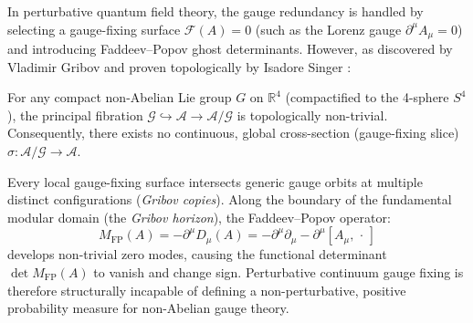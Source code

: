 In perturbative quantum field theory, the gauge redundancy is handled by selecting a gauge-fixing surface $\mathcal{F}(A) = 0$ (such as the Lorenz gauge $\partial^\mu A_\mu = 0$) and introducing Faddeev--Popov ghost determinants. However, as discovered by Vladimir Gribov \cite{Gribov1978} and proven topologically by Isadore Singer \cite{Singer1978}:
\begin{theorem}
\label{thm:singer_gribov}
For any compact non-Abelian Lie group $G$ on $\mathbb{R}^4$ (compactified to the 4-sphere $S^4$), the principal fibration $\mathcal{G} \hookrightarrow \mathcal{A} \to \mathcal{A}/\mathcal{G}$ is topologically non-trivial. Consequently, there exists no continuous, global cross-section (gauge-fixing slice) $\sigma : \mathcal{A}/\mathcal{G} \to \mathcal{A}$.
\end{theorem}
Every local gauge-fixing surface intersects generic gauge orbits at multiple distinct configurations (\emph{Gribov copies}). Along the boundary of the fundamental modular domain (the \emph{Gribov horizon}), the Faddeev--Popov operator:
\begin{equation}
M_{\mathrm{FP}}(A) = -\partial^\mu D_\mu(A) = -\partial^\mu \partial_\mu - \partial^\mu [A_\mu, \, \cdot \,]
\end{equation}
develops non-trivial zero modes, causing the functional determinant $\det M_{\mathrm{FP}}(A)$ to vanish and change sign. Perturbative continuum gauge fixing is therefore structurally incapable of defining a non-perturbative, positive probability measure for non-Abelian gauge theory.

